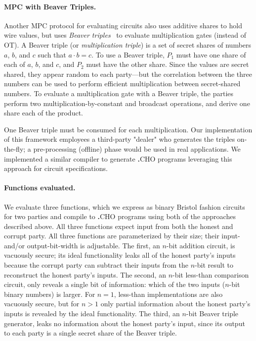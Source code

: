 \documentclass[acmlarge, manuscript, screen, review, anonymous, table]{acmart}
\newcommand{\langname}{\textsc{\textbf{.}CHO}\xspace}
\begin{document}
\paragraph{MPC with Beaver Triples.}
Another MPC protocol for evaluating circuits also uses additive shares to hold wire values,
but uses \emph{Beaver triples}~\cite{beaver1992efficient} to evaluate multiplication gates (instead of OT).
A Beaver triple (or \emph{multiplication triple}) is a set of secret shares of numbers $a$, $b$, and $c$ such that $a \cdot b = c$.
To use a Beaver triple, $P_1$ must have one share of each of $a$, $b$, and $c$, and $P_2$ must have the other share.
Since the values are secret shared, they appear random to each party---but
the correlation between the three numbers can be used to perform efficient multiplication between secret-shared numbers.
To evaluate a multiplication gate with a Beaver triple,
the parties perform two multiplication-by-constant and broadcast operations, and derive one share each of the product.

One Beaver triple must be consumed for each multiplication.
Our implementation of this framework employees a third-party "dealer" who generates the triples on-the-fly;
a pre-processing (offline) phase would be used in real applications.
We implemented a similar compiler to generate \langname programs leveraging this approach for circuit specifications.


\paragraph{Functions evaluated.}
We evaluate three functions, which we express as binary Bristol fashion circuits~\cite{bristol_circuits_website} for two parties
and compile to \langname programs using both of the approaches described above.
All three functions expect input from both the honest and corrupt party.
All three functions are parameterized by their size; their input- and/or output-bit-width is adjustable.
The first, an $n$-bit addition circuit, is vacuously secure;
its ideal functionality leaks all of the honest party's inputs
because the corrupt party can subtract their inputs from the $n$-bit result to reconstruct the honest party's inputs.
The second, an $n$-bit less-than comparison circuit,
only reveals a single bit of information:
which of the two inputs ($n$-bit binary numbers) is larger.
For $n=1$, less-than implementations are also vacuously secure,
but for $n>1$ only partial information about the honest party's inputs is revealed by the ideal functionality.
The third, an $n$-bit Beaver triple generator, leaks no information about the honest party's input,
since its output to each party is a single secret share of the Beaver triple.
\end{document}
